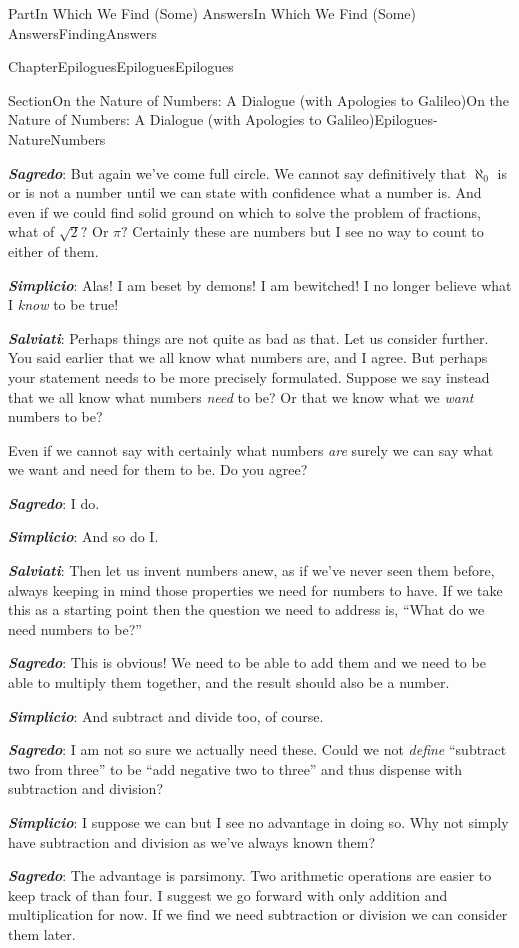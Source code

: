 \documentclass[oneside,10pt,]{book}
\newcommand{\alert}[1]{\textbf{\textit{#1}}}
\numberwithin{equation}{part}
\begin{document}
\begin{partptx}{Part}{In Which We Find (Some) Answers}{}{In Which We Find (Some) Answers}{}{}{FindingAnswers}
\begin{chapterptx}{Chapter}{Epilogues}{}{Epilogues}{}{}{Epilogues}
\begin{sectionptx}{Section}{On the Nature of Numbers: A Dialogue (with Apologies to Galileo)}{}{On the Nature of Numbers: A Dialogue (with Apologies to Galileo)}{}{}{Epilogues-NatureNumbers}
\begin{introduction}{}
\par
\alert{Sagredo}:  But again we've come full circle. We cannot say definitively that \(\aleph_0\) is or is not a number until we can state with confidence what a number is. And even if we could find solid ground on which to solve the problem of fractions, what of \(\sqrt{2}?\) Or \(\pi?\) Certainly these are numbers but I see no way to count to either of them.%
\par
\alert{Simplicio}:  Alas! I am beset by demons! I am bewitched! I no longer believe what I \emph{know} to be true!%
\par
\alert{Salviati}:  Perhaps things are not quite as bad as that. Let us consider further. You said earlier that we all know what numbers are, and I agree. But perhaps your statement needs to be more precisely formulated. Suppose we say instead that we all know what numbers \emph{need} to be? Or that we know what we \emph{want} numbers to be?%
\par
Even if we cannot say with certainly what numbers \emph{are} surely we can say what we want and need for them to be. Do you agree?%
\par
\alert{Sagredo}:  I do.%
\par
\alert{Simplicio}:  And so do I.%
\par
\alert{Salviati}:  Then let us invent numbers anew, as if we've never seen them before, always keeping in mind those properties we need for numbers to have. If we take this as a starting point then the question we need to address is, ``What do we need numbers to be?''%
\par
\alert{Sagredo}:  This is obvious! We need to be able to add them and we need to be able to multiply them together, and the result should also be a number.%
\par
\alert{Simplicio}:  And subtract and divide too, of course.%
\par
\alert{Sagredo}:  I am not so sure we actually need these. Could we not \emph{define} ``subtract two from three'' to be ``add negative two to three'' and thus dispense with subtraction and division?%
\par
\alert{Simplicio}:  I suppose we can but I see no advantage in doing so. Why not simply have subtraction and division as we've always known them?%
\par
\alert{Sagredo}:  The advantage is parsimony. Two arithmetic operations are easier to keep track of than four. I suggest we go forward with only addition and multiplication for now. If we find we need subtraction or division we can consider them later.%

\end{introduction}
\end{sectionptx}
\end{chapterptx}
\end{partptx}
\end{document}
